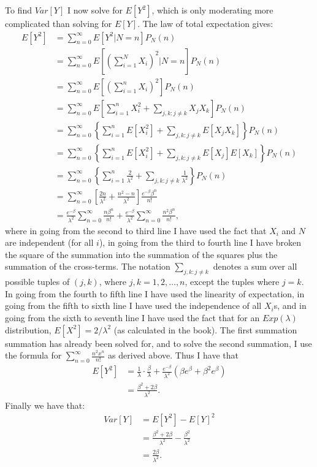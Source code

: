 \begin{problem}{15}
To find $Var[Y]$ I now solve for $E[Y^2]$, which is only moderating more complicated than solving for $E[Y]$.  The law of total expectation gives:
\begin{align*}
E[Y^2] &= \sum_{n=0}^\infty E[Y^2|N=n]P_N(n) \\
& = \sum_{n=0}^\infty E\left [\left ( \sum_{i=1}^N X_i \right )^2|N=n \right ]P_N(n) \\
& = \sum_{n=0}^\infty E\left [\left ( \sum_{i=1}^n X_i \right )^2 \right ]P_N(n) \\
& = \sum_{n=0}^\infty E\left [\sum_{i=1}^n X_i^2+ \sum_{j, k: j \neq k} X_j X_k\right ]P_N(n) \\
& = \sum_{n=0}^\infty \left \{\sum_{i=1}^n E[X_i^2]+ \sum_{j, k: j \neq k}  E[X_j X_k] \right \}P_N(n) \\
& = \sum_{n=0}^\infty \left \{\sum_{i=1}^n E[X_i^2]+ \sum_{j, k: j \neq k}  E[X_j] E[X_k] \right \}P_N(n) \\
& = \sum_{n=0}^\infty \left \{\sum_{i=1}^n \frac{2}{\lambda^2}+\sum_{j, k: j \neq k} \frac{1}{\lambda^2} \right \}P_N(n) \\
& = \sum_{n=0}^\infty \left [ \frac{2n}{\lambda^2}+ \frac{n^2-n}{\lambda^2} \right ]\frac{e^{-\beta} \beta^n}{n!} \\
& = \frac{e^{-\beta}}{\lambda^2}\sum_{n=0}^\infty \frac{n \beta^n}{n!}+ \frac{e^{-\beta}}{\lambda^2}\sum_{n=0}^\infty \frac{n^2 \beta^n}{n!},
\end{align*}
where in going from the second to third line I have used the fact that $X_i$ and $N$ are independent (for all $i$), in going from the third to fourth line I have broken the square of the summation into the summation of the squares plus the summation of the cross-terms.  The notation $\sum_{j, k: j \neq k}$ denotes a sum over all possible tuples of $(j,k)$, where $j, k =1, 2, \ldots, n$, except the tuples where $j=k$. In going from the fourth to fifth line I have used the linearity of expectation, in going from the fifth to sixth line I have used the independence of all $X_i$s, and in going from the sixth to seventh line I have used the fact that for an $Exp(\lambda)$ distribution, $E[X^2] = 2/\lambda^2$ (as calculated in the book).  The first summation summation has already been solved for, and to solve the second summation, I use the formula for $\sum_{n=0}^\infty \frac{n^2 x^n}{n!} $ as derived above.  Thus I have that
\begin{align*}
E[Y^2] &= \frac{1}{\lambda} \cdot \frac{\beta}{\lambda}+ \frac{e^{-\beta}}{\lambda^2} \left (\beta e^{\beta}+\beta^2 e^{\beta} \right) \\
& = \frac{\beta^2 +2 \beta}{\lambda^2}.
\end{align*}
Finally we have that:
\begin{align*}
Var[Y] &=  E[Y^2]  -E[Y]^2 \\
&=  \frac{\beta^2 +2 \beta}{\lambda^2} -\frac{\beta^2}{\lambda^2} \\
& = \frac{2 \beta}{\lambda^2}.
\end{align*}

\end{problem}


